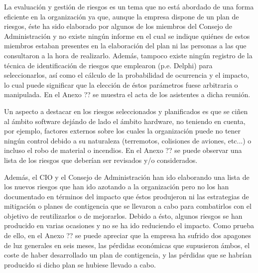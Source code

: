\begin{spacing}{1.4}

La evaluación y gestión de riesgos es un tema que no está abordado de
una forma eficiente en la organización ya que, aunque la empresa
dispone de un plan de riesgos, éste ha sido elaborado por algunos de
los miembros del Consejo de Administración y no existe ningún informe
en el cual se indique quiénes de estos miembros estaban presentes en la
elaboración del plan ni las personas a las que consultaron a la hora
de realizarlo. Además, tampoco existe ningún registro de la técnica de
identificación de riesgos que emplearon (p.e. Delphi) para
seleccionarlos, así como el cálculo de la probabilidad de ocurrencia y
el impacto, lo cual puede significar que la elección de éstos parámetros
fuese arbitraria o manipulada. En el Anexo ?? se muestra el acta de
los asistentes a dicha reunión. 

Un aspecto a destacar en los riesgos seleccionados y planificados es
que se ciñen al ámbito software dejándo de lado el ámbito hardware, no
teniendo en  cuenta, por ejemplo, factores externos sobre los cuales
la organización puede no tener ningún control debido a su naturaleza
(terremotos, colisiones de aviones, etc...) o incluso el robo de material o
incendios. En el Anexo ?? se puede observar una lista de los riesgos
que deberían ser revisados y/o considerados.

Además, el CIO y el Consejo de Administración han ido elaborando una
lista de los nuevos riesgos que han ido azotando a la organización
pero no los han documentado en términos del impacto que éstos
produjeron ni las estrategias de mitigación o planes de contigencia
que se llevaron a cabo para combatirlos con el objetivo de reutilizarlos
o de mejorarlos. Debido a ésto, algunos riesgos se han producido
en varias ocasiones y no se ha ido reduciendo el impacto. Como prueba
de ello, en el Anexo ?? se puede apreciar que la empresa ha sufrido
dos apagones de luz generales en seis meses, las pérdidas económicas
que supusieron ámbos, el coste de haber desarrollado un plan de
contigencia, y las pérdidas que se habrían producido si dicho plan se
hubiese llevado a cabo.

\end{spacing}